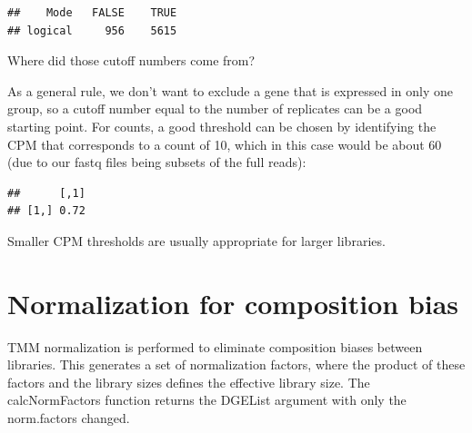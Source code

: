 \documentclass[
]{book}
\newenvironment{Shaded}{\begin{snugshade}}{\end{snugshade}}
\newcommand{\DecValTok}[1]{\textcolor[rgb]{0.00,0.00,0.81}{#1}}
\newcommand{\FunctionTok}[1]{\textcolor[rgb]{0.13,0.29,0.53}{\textbf{#1}}}
\newcommand{\NormalTok}[1]{#1}
\newcommand{\OtherTok}[1]{\textcolor[rgb]{0.56,0.35,0.01}{#1}}
\newcommand{\SpecialCharTok}[1]{\textcolor[rgb]{0.81,0.36,0.00}{\textbf{#1}}}
\begin{document}
\begin{verbatim}
##    Mode   FALSE    TRUE 
## logical     956    5615
\end{verbatim}

Where did those cutoff numbers come from?

As a general rule, we don't want to exclude a gene that is expressed in
only one group, so a cutoff number equal to the number of replicates can
be a good starting point. For counts, a good threshold can be chosen by
identifying the CPM that corresponds to a count of 10, which in this
case would be about 60 (due to our fastq files being subsets of the full
reads):

\begin{Shaded}
\end{Shaded}

\begin{verbatim}
##      [,1]
## [1,] 0.72
\end{verbatim}

Smaller CPM thresholds are usually appropriate for larger libraries.

\hypertarget{normalization-for-composition-bias-1}{%
\section{Normalization for composition bias}\label{normalization-for-composition-bias-1}}

TMM normalization is performed to eliminate composition biases between
libraries. This generates a set of normalization factors, where the
product of these factors and the library sizes defines the effective
library size. The calcNormFactors function returns the DGEList argument
with only the norm.factors changed.

\begin{Shaded}
\end{Shaded}
\end{document}
